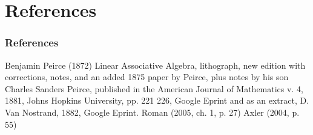 \documentclass{beamer}
\begin{document}
    \section{References}
    \begin{frame}
        \frametitle{References}
        \begin{thebibliography}{1}

             {
                Benjamin Peirce (1872) Linear Associative Algebra, lithograph, new edition with corrections, notes,
                and an added 1875 paper by Peirce, plus notes by his son Charles Sanders Peirce, published in
                the American Journal of Mathematics v. 4, 1881, Johns Hopkins University, pp. 221 226, Google Eprint}
             {
                and as an extract, D. Van Nostrand, 1882, Google Eprint.}
             {
                Roman (2005, ch. 1, p. 27)}
             {
                Axler (2004, p. 55)}
        \end{thebibliography}

    \end{frame}
\end{document}
